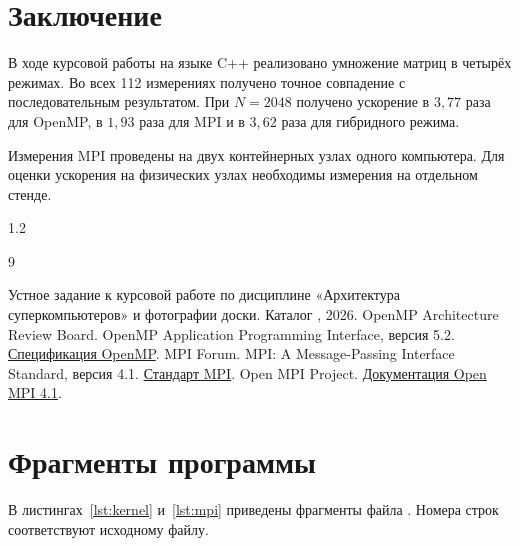 \clearpage




\section{Заключение}

В ходе курсовой работы на языке C++ реализовано умножение матриц в четырёх режимах. Во всех 112 измерениях получено точное совпадение с последовательным результатом. При $N=2048$ получено ускорение в $3{,}77$ раза для OpenMP, в $1{,}93$ раза для MPI и в $3{,}62$ раза для гибридного режима.

Измерения MPI проведены на двух контейнерных узлах одного компьютера. Для оценки ускорения на физических узлах необходимы измерения на отдельном стенде.

\renewcommand{\refname}{Список источников}
\begin{spacing}{1.2}
\begin{thebibliography}{9}
\raggedright
{} Устное задание к курсовой работе по дисциплине «Архитектура суперкомпьютеров» и фотографии доски. Каталог , 2026.
 OpenMP Architecture Review Board. OpenMP Application Programming Interface, версия 5.2. \href{https://www.openmp.org/spec-html/5.2/openmp.html}{Спецификация OpenMP}.
 MPI Forum. MPI: A Message-Passing Interface Standard, версия 4.1. \href{https://www.mpi-forum.org/docs/mpi-4.1/mpi41-report.pdf}{Стандарт MPI}.
 Open MPI Project. \href{https://www.open-mpi.org/doc/v4.1/}{Документация Open MPI 4.1}.
\end{thebibliography}
\end{spacing}

\clearpage
\appendix
\section{Фрагменты программы}

В листингах~\ref{lst:kernel} и~\ref{lst:mpi} приведены фрагменты файла . Номера строк соответствуют исходному файлу.





